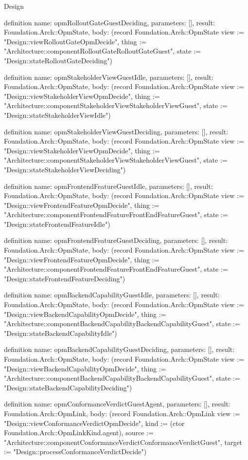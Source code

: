 \begin{lexlean}{Design}
\begin{semanticmodule}
definition{
  name: opmRolloutGateGuestDeciding,
  parameters: [],
  result: Foundation.Arch::OpmState,
  body: (record Foundation.Arch::OpmState {view := "Design::viewRolloutGateOpmDecide", thing := "Architecture::componentRolloutGateRolloutGateGuest", state := "Design::stateRolloutGateDeciding"})
}

definition{
  name: opmStakeholderViewGuestIdle,
  parameters: [],
  result: Foundation.Arch::OpmState,
  body: (record Foundation.Arch::OpmState {view := "Design::viewStakeholderViewOpmDecide", thing := "Architecture::componentStakeholderViewStakeholderViewGuest", state := "Design::stateStakeholderViewIdle"})
}

definition{
  name: opmStakeholderViewGuestDeciding,
  parameters: [],
  result: Foundation.Arch::OpmState,
  body: (record Foundation.Arch::OpmState {view := "Design::viewStakeholderViewOpmDecide", thing := "Architecture::componentStakeholderViewStakeholderViewGuest", state := "Design::stateStakeholderViewDeciding"})
}

definition{
  name: opmFrontendFeatureGuestIdle,
  parameters: [],
  result: Foundation.Arch::OpmState,
  body: (record Foundation.Arch::OpmState {view := "Design::viewFrontendFeatureOpmDecide", thing := "Architecture::componentFrontendFeatureFrontEndFeatureGuest", state := "Design::stateFrontendFeatureIdle"})
}

definition{
  name: opmFrontendFeatureGuestDeciding,
  parameters: [],
  result: Foundation.Arch::OpmState,
  body: (record Foundation.Arch::OpmState {view := "Design::viewFrontendFeatureOpmDecide", thing := "Architecture::componentFrontendFeatureFrontEndFeatureGuest", state := "Design::stateFrontendFeatureDeciding"})
}

definition{
  name: opmBackendCapabilityGuestIdle,
  parameters: [],
  result: Foundation.Arch::OpmState,
  body: (record Foundation.Arch::OpmState {view := "Design::viewBackendCapabilityOpmDecide", thing := "Architecture::componentBackendCapabilityBackendCapabilityGuest", state := "Design::stateBackendCapabilityIdle"})
}

definition{
  name: opmBackendCapabilityGuestDeciding,
  parameters: [],
  result: Foundation.Arch::OpmState,
  body: (record Foundation.Arch::OpmState {view := "Design::viewBackendCapabilityOpmDecide", thing := "Architecture::componentBackendCapabilityBackendCapabilityGuest", state := "Design::stateBackendCapabilityDeciding"})
}

definition{
  name: opmConformanceVerdictGuestAgent,
  parameters: [],
  result: Foundation.Arch::OpmLink,
  body: (record Foundation.Arch::OpmLink {view := "Design::viewConformanceVerdictOpmDecide", kind := (ctor Foundation.Arch::OpmLinkKind.agent), source := "Architecture::componentConformanceVerdictConformanceVerdictGuest", target := "Design::processConformanceVerdictDecide"})
}


\end{semanticmodule}
\end{lexlean}
